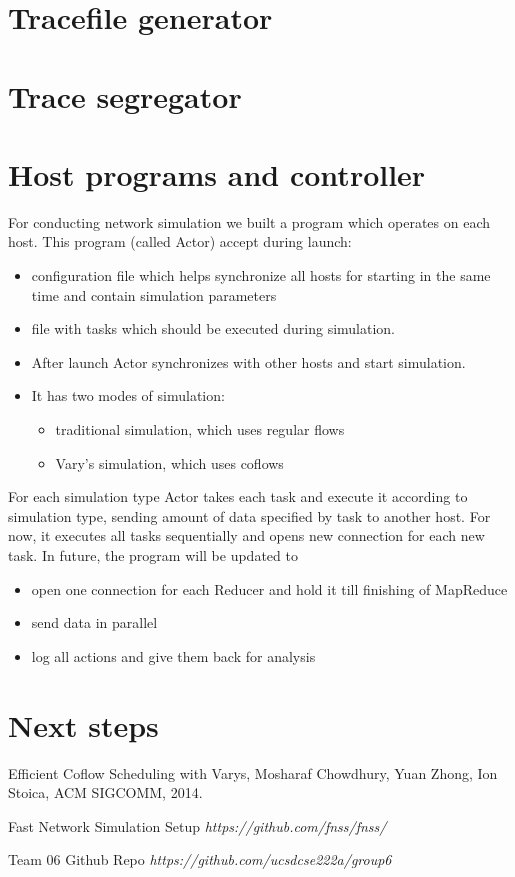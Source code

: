 \documentclass{article}
\begin{document}
\section{Tracefile generator}


\section{Trace segregator}

\section{Host programs and controller}
For conducting network simulation we built a program which  operates on each host. This program (called Actor) accept during launch:
\begin{itemize}
\item configuration file which helps synchronize all hosts for starting in the same time and contain simulation parameters
\item file with tasks which should be executed during simulation.
\item After launch Actor synchronizes with other hosts and start simulation.
\item It has two modes of simulation:

\begin{itemize}
\item traditional simulation, which uses regular flows
\item Vary's simulation, which uses coflows
\end{itemize}
\end{itemize}

For each simulation type Actor takes each task and execute it according to simulation type, sending amount of data specified by task to another host.
For now, it executes all tasks sequentially and opens new connection for each new task. In future, the program will be updated to 

\begin{itemize}
\item open one connection for each Reducer and hold it till finishing of MapReduce
\item send data in parallel
\item log all actions and give them back for analysis
\end{itemize}

\section{Next steps}



\begin{thebibliography}{10}
Efficient Coflow Scheduling with Varys, Mosharaf Chowdhury, Yuan Zhong, Ion Stoica, ACM SIGCOMM, 2014.

Fast Network Simulation Setup \textit{https://github.com/fnss/fnss/}

Team 06 Github Repo \textit{https://github.com/ucsdcse222a/group6}

\end{thebibliography}
\end{document}

